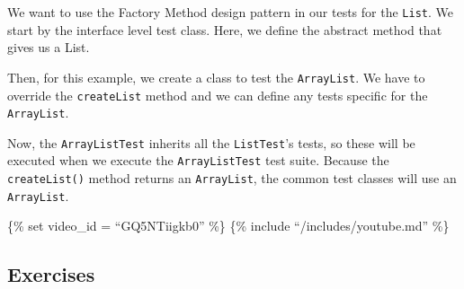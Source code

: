We want to use the Factory Method design pattern in our tests for the
\texttt{List}. We start by the interface level test class. Here, we
define the abstract method that gives us a List.

\begin{Shaded}
\begin{Highlighting}[]
  

    \NormalTok{();}

     \NormalTok{();}

\NormalTok{\}}
\end{Highlighting}
\end{Shaded}

Then, for this example, we create a class to test the
\texttt{ArrayList}. We have to override the \texttt{createList} method
and we can define any tests specific for the \texttt{ArrayList}.

\begin{Shaded}
\begin{Highlighting}[]
 

    \NormalTok{() \{}
      \NormalTok{();}
\NormalTok{  \}}

\NormalTok{\}}
\end{Highlighting}
\end{Shaded}

Now, the \texttt{ArrayListTest} inherits all the \texttt{ListTest}'s
tests, so these will be executed when we execute the
\texttt{ArrayListTest} test suite. Because the \texttt{createList()}
method returns an \texttt{ArrayList}, the common test classes will use
an \texttt{ArrayList}.

\{\% set video\_id = ``GQ5NTiigkb0'' \%\} \{\% include
``/includes/youtube.md'' \%\}

\hypertarget{exercises}{%
\subsection{Exercises}\label{exercises}}

